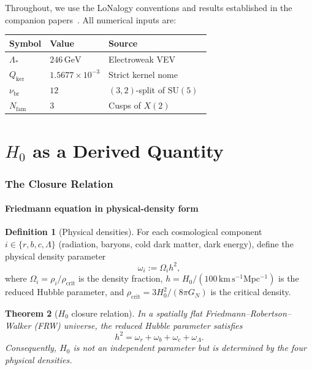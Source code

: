 \documentclass[12pt]{article}
\theoremstyle{plain}
\newtheorem{theorem}{Theorem}[section]
\theoremstyle{definition}
\newtheorem{definition}[theorem]{Definition}
\numberwithin{equation}{section}
\newcommand{\br}{\mathrm{br}}
\newcommand{\kker}{\mathrm{ker}}
\newcommand{\crit}{\mathrm{crit}}
\begin{document}
Throughout, we use the LoNalogy conventions and results established in the
companion papers~\cite{YMmassGap,ParticleCosmo,LoNalogyv87}.  All numerical
inputs are:
\begin{center}
\begin{tabular}{lll}
\toprule
Symbol & Value & Source\\
\midrule
$\Lambda_*$ & $246\,\mathrm{GeV}$ & Electroweak VEV\\
$Q_{\kker}$ & $1.5677\times10^{-3}$ & Strict kernel nome~\cite{YMmassGap}\\
$\nu_{\br}$ & $12$ & $(3,2)$-split of $\mathrm{SU}(5)$~\cite{YMmassGap}\\
$N_{\mathrm{fam}}$ & $3$ & Cusps of $X(2)$~\cite{YMmassGap}\\
\bottomrule
\end{tabular}
\end{center}


\part{$H_0$ as a Derived Quantity}

\section{The Closure Relation}\label{sec:closure}

\subsection{Friedmann equation in physical-density form}

\begin{definition}[Physical densities]
For each cosmological component $i\in\{r,b,c,\Lambda\}$ (radiation, baryons,
cold dark matter, dark energy), define the physical density parameter
\begin{equation}
\omega_i := \Omega_i h^2,
\end{equation}
where $\Omega_i=\rho_i/\rho_{\crit}$ is the density fraction,
$h=H_0/(100\,\mathrm{km\,s^{-1}Mpc^{-1}})$ is the reduced Hubble
parameter, and $\rho_{\crit}=3H_0^2/(8\pi G_N)$ is the critical density.
\end{definition}

\begin{theorem}[$H_0$ closure relation]\label{thm:closure}
In a spatially flat Friedmann--Robertson--Walker (FRW) universe, the reduced
Hubble parameter satisfies
\begin{equation}\label{eq:closure}
\boxed{h^2 = \omega_r + \omega_b + \omega_c + \omega_\Lambda.}
\end{equation}
Consequently, $H_0$ is not an independent parameter but is determined by the
four physical densities.
\end{theorem}
\end{document}
